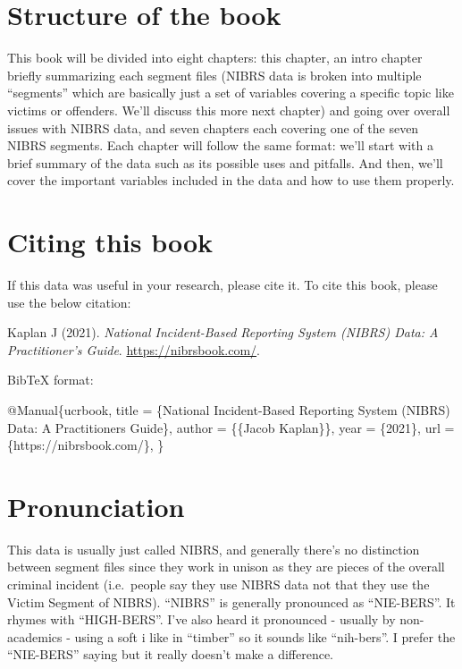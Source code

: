 \documentclass[
  12pt,
  openany]{book}
\newenvironment{Shaded}{\begin{snugshade}}{\end{snugshade}}
\newcommand{\DataTypeTok}[1]{\textcolor[rgb]{0.27,0.27,0.27}{#1}}
\newcommand{\NormalTok}[1]{#1}
\newcommand{\OtherTok}[1]{\textcolor[rgb]{0.37,0.37,0.37}{#1}}
\newcommand{\VariableTok}[1]{\textcolor[rgb]{0,0,0}{#1}}
\begin{document}
\hypertarget{structure-of-the-book}{%
\section{Structure of the book}\label{structure-of-the-book}}

This book will be divided into eight chapters: this chapter, an intro chapter briefly summarizing each segment files (NIBRS data is broken into multiple ``segments'' which are basically just a set of variables covering a specific topic like victims or offenders. We'll discuss this more next chapter) and going over overall issues with NIBRS data, and seven chapters each covering one of the seven NIBRS segments. Each chapter will follow the same format: we'll start with a brief summary of the data such as its possible uses and pitfalls. And then, we'll cover the important variables included in the data and how to use them properly.

\hypertarget{citing-this-book}{%
\section{Citing this book}\label{citing-this-book}}

If this data was useful in your research, please cite it. To cite this book, please use the below citation:

Kaplan J (2021). \emph{National Incident-Based Reporting System (NIBRS) Data: A Practitioner's Guide}. \url{https://nibrsbook.com/}.

BibTeX format:

\begin{Shaded}
\begin{Highlighting}[]
\VariableTok{@Manual}\NormalTok{\{}\OtherTok{ucrbook}\NormalTok{,}
  \DataTypeTok{title}\NormalTok{ = \{National Incident{-}Based Reporting System (NIBRS) Data: A Practitioner\textquotesingle{}s Guide\},}
  \DataTypeTok{author}\NormalTok{ = \{\{Jacob Kaplan\}\},}
  \DataTypeTok{year}\NormalTok{ = \{2021\},}
  \DataTypeTok{url}\NormalTok{ = \{https://nibrsbook.com/\},}
\NormalTok{\}}
\end{Highlighting}
\end{Shaded}

\hypertarget{pronunciation}{%
\section{Pronunciation}\label{pronunciation}}

This data is usually just called NIBRS, and generally there's no distinction between segment files since they work in unison as they are pieces of the overall criminal incident (i.e.~people say they use NIBRS data not that they use the Victim Segment of NIBRS). ``NIBRS'' is generally pronounced as ``NIE-BERS''. It rhymes with ``HIGH-BERS''. I've also heard it pronounced - usually by non-academics - using a soft i like in ``timber'' so it sounds like ``nih-bers''. I prefer the ``NIE-BERS'' saying but it really doesn't make a difference.
\end{document}
